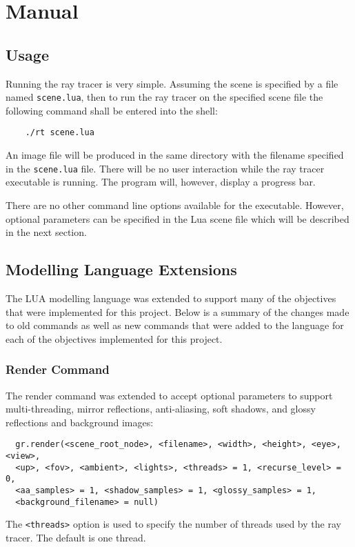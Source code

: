 \chapter{Manual}

\section{Usage}
Running the ray tracer is very simple. Assuming the scene is specified by a file
named \verb|scene.lua|, then to run the ray tracer on the specified scene file
the following command shall be entered into the shell:
\begin{verbatim}
    ./rt scene.lua
\end{verbatim}
An image file will be produced in the same directory with the filename specified
in the  \verb|scene.lua| file. There will be no user interaction while the ray
tracer executable is running. The program will, however, display a progress bar.

There are no other command line options available for the executable. However,
optional parameters can be specified in the Lua scene file which will be
described in the next section.

\section{Modelling Language Extensions}
The LUA modelling language was extended to support many of the objectives that
were implemented for this project. Below is a summary of the changes made to old
commands as well as new commands that were added to the language for each of the
objectives implemented for this project.

\subsection*{Render Command}
The render command was extended to accept optional parameters to support
multi-threading, mirror reflections, anti-aliasing, soft shadows, and glossy
reflections and background images:
\begin{verbatim}
  gr.render(<scene_root_node>, <filename>, <width>, <height>, <eye>, <view>,
  <up>, <fov>, <ambient>, <lights>, <threads> = 1, <recurse_level> = 0,
  <aa_samples> = 1, <shadow_samples> = 1, <glossy_samples> = 1,
  <background_filename> = null)
\end{verbatim}
The \verb|<threads>| option is used to specify the number of threads used by the
ray tracer. The default is one thread.

